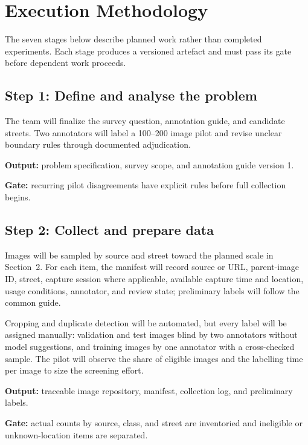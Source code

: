 \section{Execution Methodology}

The seven stages below describe planned work rather than completed experiments. Each stage produces a versioned artefact and must pass its gate before dependent work proceeds.

\subsection{Step 1: Define and analyse the problem}

The team will finalize the survey question, annotation guide, and candidate streets. Two annotators will label a 100--200 image pilot and revise unclear boundary rules through documented adjudication.

\textbf{Output:} problem specification, survey scope, and annotation guide version 1.

\textbf{Gate:} recurring pilot disagreements have explicit rules before full collection begins.

\subsection{Step 2: Collect and prepare data}

Images will be sampled by source and street toward the planned scale in Section~2. For each item, the manifest will record source or URL, parent-image ID, street, capture session where applicable, available capture time and location, usage conditions, annotator, and review state; preliminary labels will follow the common guide.

Cropping and duplicate detection will be automated, but every label will be assigned manually: validation and test images blind by two annotators without model suggestions, and training images by one annotator with a cross-checked sample. The pilot will observe the share of eligible images and the labelling time per image to size the screening effort.

\textbf{Output:} traceable image repository, manifest, collection log, and preliminary labels.

\textbf{Gate:} actual counts by source, class, and street are inventoried and ineligible or unknown-location items are separated.

